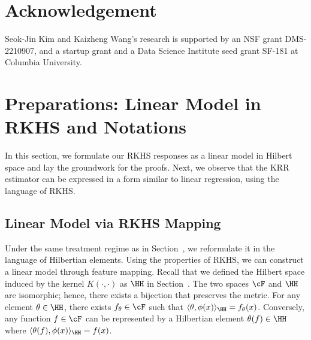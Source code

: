 \documentclass[12pt,a4paper,pdftex,onepage]{article}
\begin{document}
\section*{Acknowledgement}
Seok-Jin Kim and Kaizheng Wang’s research is supported by an NSF grant DMS-2210907, and
a startup grant and a Data Science Institute seed grant SF-181 at Columbia University.



\clearpage
\newpage


\appendix

\setcounter{table}{0}
\setcounter{figure}{0}
\setcounter{equation}{0}


\renewcommand{\thefigure}{A\arabic{figure}}
\renewcommand{\thetable}{A\arabic{table}}
\renewcommand{\theequation}{A\arabic{equation}}


\clearpage
\newpage

\tableofcontents





\clearpage
\newpage
\section{Preparations: Linear Model in RKHS and Notations}\label{section; groundwork}
In this section, we formulate our RKHS responses as a linear model in Hilbert space and lay the groundwork for the proofs.  
Next, we observe that the KRR estimator can be expressed in a form similar to linear regression, using the language of RKHS.  

\subsection{Linear Model via RKHS Mapping}
Under the same treatment regime as in Section~, we reformulate it in the language of Hilbertian elements.  
Using the properties of RKHS, we can construct a linear model through feature mapping.  
Recall that we defined the Hilbert space induced by the kernel \( K(\cdot,\cdot) \) as \( \HH \) in Section~.  
The two spaces \( \cF \) and \( \HH \) are isomorphic; hence, there exists a bijection that preserves the metric.  
For any element \( \theta \in \HH \), there exists \( f_\theta \in \cF \) such that \( \langle \theta, \phi(x) \rangle_{\HH} = f_\theta(x) \).  
Conversely, any function \( f \in \cF \) can be represented by a Hilbertian element \( \theta(f) \in \HH \) where \( \langle \theta(f), \phi(x) \rangle_{\HH} = f(x) \).  
\end{document}
